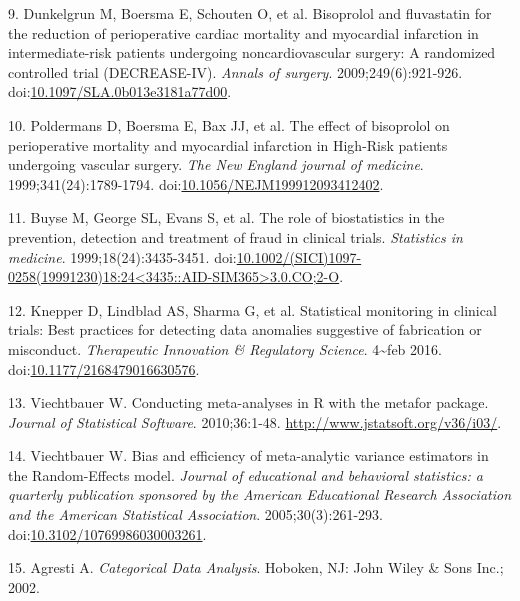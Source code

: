 \documentclass[]{article}
\begin{document}
\hypertarget{ref-dunkelgrun2009}{}
9. Dunkelgrun M, Boersma E, Schouten O, et al. Bisoprolol and
fluvastatin for the reduction of perioperative cardiac mortality and
myocardial infarction in intermediate-risk patients undergoing
noncardiovascular surgery: A randomized controlled trial (DECREASE-IV).
\emph{Annals of surgery}. 2009;249(6):921-926.
doi:\href{https://doi.org/10.1097/SLA.0b013e3181a77d00}{10.1097/SLA.0b013e3181a77d00}.

\hypertarget{ref-poldermans1999}{}
10. Poldermans D, Boersma E, Bax JJ, et al. The effect of bisoprolol on
perioperative mortality and myocardial infarction in High-Risk patients
undergoing vascular surgery. \emph{The New England journal of medicine}.
1999;341(24):1789-1794.
doi:\href{https://doi.org/10.1056/NEJM199912093412402}{10.1056/NEJM199912093412402}.

\hypertarget{ref-Buyse1999-jq}{}
11. Buyse M, George SL, Evans S, et al. The role of biostatistics in the
prevention, detection and treatment of fraud in clinical trials.
\emph{Statistics in medicine}. 1999;18(24):3435-3451.
doi:\href{https://doi.org/10.1002/(SICI)1097-0258(19991230)18:24\%3C3435::AID-SIM365\%3E3.0.CO;2-O}{10.1002/(SICI)1097-0258(19991230)18:24\textless{}3435::AID-SIM365\textgreater{}3.0.CO;2-O}.

\hypertarget{ref-Knepper2016-la}{}
12. Knepper D, Lindblad AS, Sharma G, et al. Statistical monitoring in
clinical trials: Best practices for detecting data anomalies suggestive
of fabrication or misconduct. \emph{Therapeutic Innovation \& Regulatory
Science}. 4\textasciitilde{}feb 2016.
doi:\href{https://doi.org/10.1177/2168479016630576}{10.1177/2168479016630576}.

\hypertarget{ref-viechtbauer2010}{}
13. Viechtbauer W. Conducting meta-analyses in R with the metafor
package. \emph{Journal of Statistical Software}. 2010;36:1-48.
\url{http://www.jstatsoft.org/v36/i03/}.

\hypertarget{ref-viechtbauer2005}{}
14. Viechtbauer W. Bias and efficiency of meta-analytic variance
estimators in the Random-Effects model. \emph{Journal of educational and
behavioral statistics: a quarterly publication sponsored by the American
Educational Research Association and the American Statistical
Association}. 2005;30(3):261-293.
doi:\href{https://doi.org/10.3102/10769986030003261}{10.3102/10769986030003261}.

\hypertarget{ref-agresti2002}{}
15. Agresti A. \emph{Categorical Data Analysis}. Hoboken, NJ: John Wiley
\& Sons Inc.; 2002.
\end{document}
